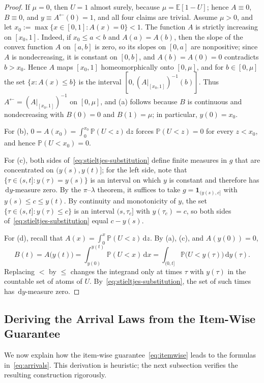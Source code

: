 \documentclass[11pt]{article}
\theoremstyle{definition}
\theoremstyle{remark}
\newcommand{\Pp}{\mathbb P}
\newcommand{\E}{\mathbb E}
\newcommand{\dd}{\,\mathrm d}
\newcommand{\ind}{\mathbf 1}
\begin{document}
\begin{proof}
If $\mu=0$, then $U=1$ almost surely, because $\mu=\E[1-U]$; hence $A\equiv0$, $B\equiv0$, and $y\equiv A^\leftarrow(0)=1$, and all four claims are trivial.
Assume $\mu>0$, and let $x_0:=\max\{x\in[0,1]:A(x)=0\}<1$.
The function $A$ is strictly increasing on $[x_0,1]$.
Indeed, if $x_0\le a<b$ and $A(a)=A(b)$, then the slope of the convex function $A$ on $[a,b]$ is zero, so its slopes on $[0,a]$ are nonpositive; since $A$ is nondecreasing, it is constant on $[0,b]$, and $A(b)=A(0)=0$ contradicts $b>x_0$.
Hence $A$ maps $[x_0,1]$ homeomorphically onto $[0,\mu]$, and for $b\in[0,\mu]$ the set $\{x:A(x)\le b\}$ is the interval $[0,(A|_{[x_0,1]})^{-1}(b)]$.
Thus $A^\leftarrow=(A|_{[x_0,1]})^{-1}$ on $[0,\mu]$, and (a) follows because $B$ is continuous and nondecreasing with $B(0)=0$ and $B(1)=\mu$; in particular, $y(0)=x_0$.

For (b), $0=A(x_0)=\int_0^{x_0}\Pp(U<z)\dd z$ forces $\Pp(U<z)=0$ for every $z<x_0$, and hence $\Pp(U<x_0)=0$.

For (c), both sides of~\eqref{eq:stieltjes-substitution} define finite measures in $g$ that are concentrated on $(y(s),y(t)]$; for the left side, note that $\{\tau\in(s,t]:y(\tau)=y(s)\}$ is an interval on which $y$ is constant and therefore has $\dd y$-measure zero.
By the $\pi$--$\lambda$ theorem, it suffices to take $g=\ind_{(y(s),c]}$ with $y(s)\le c\le y(t)$.
By continuity and monotonicity of $y$, the set $\{\tau\in(s,t]:y(\tau)\le c\}$ is an interval $(s,\tau_c]$ with $y(\tau_c)=c$, so both sides of~\eqref{eq:stieltjes-substitution} equal $c-y(s)$.

For (d), recall that $A(x)=\int_0^x\Pp(U<z)\dd z$.
By (a), (c), and $A(y(0))=0$,
\[
 B(t)=A\bigl(y(t)\bigr)
 =\int_{y(0)}^{y(t)}\Pp(U<x)\dd x
 =\int_{(0,t]}\Pp\bigl(U<y(\tau)\bigr)\dd y(\tau).
\]
Replacing $<$ by $\le$ changes the integrand only at times $\tau$ with $y(\tau)$ in the countable set of atoms of $U$.
By~\eqref{eq:stieltjes-substitution}, the set of such times has $\dd y$-measure zero.
\end{proof}

\subsection{Deriving the Arrival Laws from the Item-Wise Guarantee}

We now explain how the item-wise guarantee~\eqref{eq:itemwise} leads to the formulas in~\eqref{eq:arrivals}.
This derivation is heuristic; the next subsection verifies the resulting construction rigorously.
\end{document}
